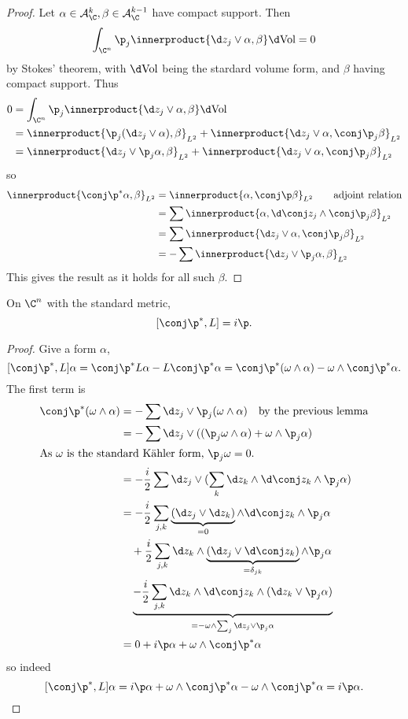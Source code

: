 \documentclass[a4paper]{article}
\newcommand{\w}{\wedge} %
\newcommand*{\ip}{\innerproduct}
\begin{document}
\begin{proof}
  Let \(\alpha \in \mathcal A_\C^k, \beta \in \mathcal A_\C^{k - 1}\) have compact support. Then
  \[
    \int_{\C^n} \p_j \ip{\d z_j \vee \alpha, \beta} \d \text{Vol} = 0
  \]
  by Stokes' theorem, with \(\d \text{Vol}\) being the stardard volume form, and \(\beta\) having compact support. Thus
  \begin{align*}
    0
    &= \int_{\C^n} \p_j \ip{\d z_j \vee \alpha, \beta} \d \text{Vol} \\
    &= \ip{\p_j (\d z_j \vee \alpha), \beta}_{L^2} + \ip{\d z_j \vee \alpha, \conj \p_j \beta}_{L^2} \\
    &= \ip{\d z_j \vee \p_j \alpha, \beta}_{L^2} + \ip{\d z_j \vee \alpha, \conj \p_j \beta}_{L^2}
  \end{align*}
  so
  \begin{align*}
    \ip{\conj \p^* \alpha, \beta}_{L^2}
    &= \ip{\alpha, \conj \p \beta}_{L^2} \qquad \text{adjoint relation} \\
    &= \sum \ip{\alpha, \d \conj z_j \w \conj \p_j \beta}_{L^2} \\
    &= \sum \ip{\d z_j \vee \alpha, \conj \p_j \beta}_{L^2} \\
    &= - \sum \ip{\d z_j \vee \p_j \alpha, \beta}_{L^2}
  \end{align*}
  This gives the result as it holds for all such \(\beta\).
\end{proof}

\begin{lemma}
  On \(\C^n\) with the standard metric,
  \[
    [\conj \p^*, L] = i\p.
  \]
\end{lemma}

\begin{proof}
  Give a form \(\alpha\),
  \[
    [\conj \p^*, L] \alpha
    = \conj \p^* L \alpha - L \conj \p^* \alpha
    = \conj \p^* (\omega \w \alpha) - \omega \w \conj \p^* \alpha.
  \]
  The first term is
  \begin{align*}
    \conj \p^* (\omega \w \alpha)
    &= - \sum \d z_j \vee \p_j (\omega \w \alpha) \quad \text{by the previous lemma} \\
    &= - \sum \d z_j \vee ((\p_j \omega \w \alpha) + \omega \w \p_j \alpha) \\
    \intertext{As \(\omega\) is the standard Kähler form, \(\p_j \omega = 0\).}
    &= - \frac{i}{2} \sum \d z_j \vee (\sum_k \d z_k \w \d \conj z_k \w \p_j \alpha) \\
    &= - \frac{i}{2} \sum_{j, k} \underbrace{(\d z_j \vee \d z_k)}_{= 0} \w \d \conj z_k \w \p_j \alpha \\
    &\quad + \frac{i}{2} \sum_{j, k} \d z_k \w \underbrace{(\d z_j \vee \d \conj z_k)}_{= \delta_{jk}} \w \p_j \alpha \\
    &\quad \underbrace{- \frac{i}{2} \sum_{j, k} \d z_k \w \d \conj z_k \w (\d z_k \vee \p_j \alpha)}_{= - \omega \w \sum_j \d z_j \vee \p_j \alpha} \\
    &= 0 + i \p \alpha + \omega \w \conj \p^* \alpha
  \end{align*}
  so indeed
  \[
    [\conj \p^*, L] \alpha
    = i \p \alpha + \omega \w \conj \p^* \alpha - \omega \w \conj \p^* \alpha
    = i \p \alpha.
  \]
\end{proof}
\end{document}
